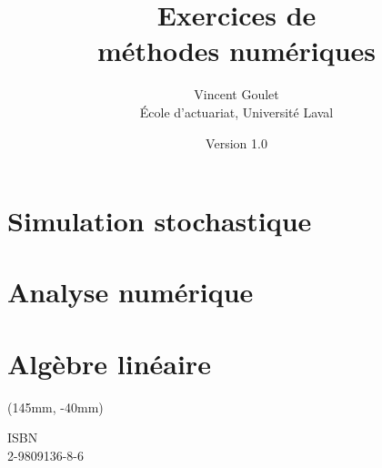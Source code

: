 \documentclass[letterpaper,10pt]{memoir}
\title{\HUGE Exercices de \\ méthodes numériques}
\author{\LARGE Vincent Goulet \\[3mm]
    \large École d'actuariat, Université Laval}
\date{\large Version 1.0}
\newcommand{\ISBN}{2-9809136-8-6}
\begin{document}

\frontmatter

\pagestyle{empty}


\pagestyle{companion}



\cleardoublepage
\tableofcontents*

\mainmatter


\part{Simulation stochastique}
\label{part:simulation}




\part{Analyse numérique}
\label{part:analysenumerique}




\part{Algèbre linéaire}
\label{part:algebrelineaire}





\appendix


\nocite{Gentle_98,Monahan_01,Rubinstein_81,Ripley_87,BurdenFaires,Anton8e}




\cleardoublepage
\printindex

\cleardoublepage
\cleartoverso

\pagestyle{empty}
\renewcommand{\ttdefault}{hlst}

\bandeverso
\begin{textblock*}{71mm}(145mm, -40mm)
  \large\ttfamily\raggedright
  \textblockcolor{}
  ISBN \\ \ISBN
\end{textblock*}
\end{document}
